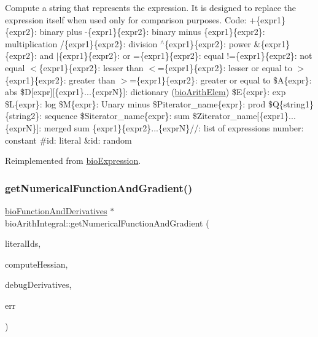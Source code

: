 Compute a string that represents the expression. It is designed to replace the expression itself when used only for comparison purposes. Code\+: +\{expr1\}\{expr2\}\+: binary plus -\/\{expr1\}\{expr2\}\+: binary minus \{expr1\}\{expr2\}\+: multiplication /\{expr1\}\{expr2\}\+: division $^\wedge$\{expr1\}\{expr2\}\+: power \&\{expr1\}\{expr2\}\+: and $\vert$\{expr1\}\{expr2\}\+: or =\{expr1\}\{expr2\}\+: equal !=\{expr1\}\{expr2\}\+: not equal $<$\{expr1\}\{expr2\}\+: lesser than $<$=\{expr1\}\{expr2\}\+: lesser or equal to $>$\{expr1\}\{expr2\}\+: greater than $>$=\{expr1\}\{expr2\}\+: greater or equal to \$A\{expr\}\+: abs \$D\mbox{[}expr\mbox{]}\mbox{[}\{expr1\}...\{exprN\}\mbox{]}\+: dictionary (\hyperlink{classbio_arith_elem}{bio\+Arith\+Elem}) \$E\{expr\}\+: exp \$L\{expr\}\+: log \$M\{expr\}\+: Unary minus \$\+Piterator\+\_\+name\{expr\}\+: prod \$Q\{string1\}\{string2\}\+: sequence \$\+Siterator\+\_\+name\{expr\}\+: sum \$\+Ziterator\+\_\+name\mbox{[}\{expr1\}...\{exprN\}\mbox{]}\+: merged sum \{expr1\}\{expr2\}...\{exprN\}//\+: list of expressions number\+: constant \#id\+: literal \&id\+: random 

Reimplemented from \hyperlink{classbio_expression_a3e4b4dca58dbbc6f0e411b30eb3f60b4}{bio\+Expression}.

\mbox{\label{classbio_arith_integral_a7f9cc73a8a9788b1deb8c2f424606d51}} 
\subsubsection{\texorpdfstring{get\+Numerical\+Function\+And\+Gradient()}{getNumericalFunctionAndGradient()}}
{\footnotesize\ttfamily \hyperlink{classbio_function_and_derivatives}{bio\+Function\+And\+Derivatives} $\ast$ bio\+Arith\+Integral\+::get\+Numerical\+Function\+And\+Gradient (\begin{DoxyParamCaption}\item[{vector$<$ pat\+U\+Long $>$}]{literal\+Ids,  }\item[{pat\+Boolean}]{compute\+Hessian,  }\item[{pat\+Boolean}]{debug\+Derivatives,  }\item[{pat\+Error $\ast$\&}]{err }\end{DoxyParamCaption})\hspace{0.3cm}{\ttfamily [virtual]}}

